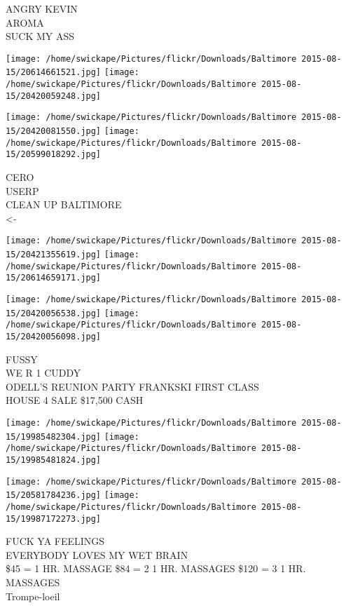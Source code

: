 \documentclass[10pt,letterpaper]{article}
\begin{document}
ANGRY KEVIN\\
AROMA\\
SUCK MY ASS\\
\pagebreak

\texttt{[image: /home/swickape/Pictures/flickr/Downloads/Baltimore 2015-08-15/20614661521.jpg]}
\texttt{[image: /home/swickape/Pictures/flickr/Downloads/Baltimore 2015-08-15/20420059248.jpg]}

\texttt{[image: /home/swickape/Pictures/flickr/Downloads/Baltimore 2015-08-15/20420081550.jpg]}
\texttt{[image: /home/swickape/Pictures/flickr/Downloads/Baltimore 2015-08-15/20599018292.jpg]}

CERO\\
USERP\\
CLEAN UP BALTIMORE\\
<{-}\\
\pagebreak

\texttt{[image: /home/swickape/Pictures/flickr/Downloads/Baltimore 2015-08-15/20421355619.jpg]}
\texttt{[image: /home/swickape/Pictures/flickr/Downloads/Baltimore 2015-08-15/20614659171.jpg]}

\texttt{[image: /home/swickape/Pictures/flickr/Downloads/Baltimore 2015-08-15/20420056538.jpg]}
\texttt{[image: /home/swickape/Pictures/flickr/Downloads/Baltimore 2015-08-15/20420056098.jpg]}

FUSSY\\
WE R 1 CUDDY\\
ODELL'S REUNION PARTY FRANKSKI FIRST CLASS\\
HOUSE 4 SALE \$17,500 CASH\\
\pagebreak

\texttt{[image: /home/swickape/Pictures/flickr/Downloads/Baltimore 2015-08-15/19985482304.jpg]}
\texttt{[image: /home/swickape/Pictures/flickr/Downloads/Baltimore 2015-08-15/19985481824.jpg]}

\texttt{[image: /home/swickape/Pictures/flickr/Downloads/Baltimore 2015-08-15/20581784236.jpg]}
\texttt{[image: /home/swickape/Pictures/flickr/Downloads/Baltimore 2015-08-15/19987172273.jpg]}

FUCK YA FEELINGS\\
EVERYBODY LOVES MY WET BRAIN\\
\$45 = 1 HR. MASSAGE \$84 = 2 1 HR. MASSAGES  \$120 = 3 1 HR. MASSAGES\\
Trompe{-}loeil\\
\pagebreak
\end{document}
